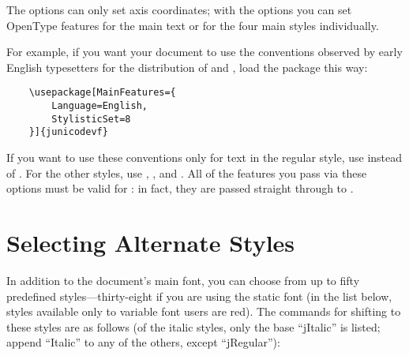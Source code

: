 The  options can only set axis coordinates; with the  
options you can
set OpenType features for the main text or for the four main styles individually.

For example, if you want your document to use the conventions observed by early
English typesetters for the distribution of  and , load the
package this way:

\footnotesize
\begin{verbatim}
    \usepackage[MainFeatures={
        Language=English,
        StylisticSet=8
    }]{junicodevf}
\end{verbatim}
\normalsize

\noindent If you want to use these conventions only for text in the regular style, use
 instead of . For the other styles, use
, , and .
All of the
features you pass via these options must be valid for \fspec: in fact,
they are passed straight through to \fspec.

\section{Selecting Alternate Styles}

In addition to the document's main font, you can choose from up to fifty
predefined styles---thirty-eight if you are using the static font (in the list below,
styles available only to variable font users are {\color{BrickRed}red}).
The commands for shifting to these
styles are as follows (of the italic styles, only the base “jItalic” is listed;
append “Italic” to any of the others, except “jRegular”):

